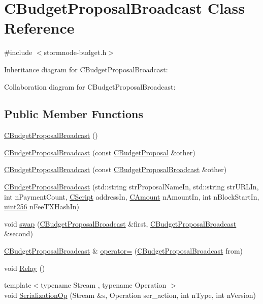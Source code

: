\hypertarget{class_c_budget_proposal_broadcast}{}\section{C\+Budget\+Proposal\+Broadcast Class Reference}
\label{class_c_budget_proposal_broadcast}


{\ttfamily \#include $<$stormnode-\/budget.\+h$>$}



Inheritance diagram for C\+Budget\+Proposal\+Broadcast\+:


Collaboration diagram for C\+Budget\+Proposal\+Broadcast\+:
\subsection*{Public Member Functions}
\begin{DoxyCompactItemize}
\item 
\hyperlink{class_c_budget_proposal_broadcast_a276f93646b7597ba602b58779ec774d7}{C\+Budget\+Proposal\+Broadcast} ()
\item 
\hyperlink{class_c_budget_proposal_broadcast_a1990e16be65f91b9fe8ddecbf368f108}{C\+Budget\+Proposal\+Broadcast} (const \hyperlink{class_c_budget_proposal}{C\+Budget\+Proposal} \&other)
\item 
\hyperlink{class_c_budget_proposal_broadcast_abdebe74d19e013273ead62e83a62d962}{C\+Budget\+Proposal\+Broadcast} (const \hyperlink{class_c_budget_proposal_broadcast}{C\+Budget\+Proposal\+Broadcast} \&other)
\item 
\hyperlink{class_c_budget_proposal_broadcast_ab730123d69f4481b88af666914c2da98}{C\+Budget\+Proposal\+Broadcast} (std\+::string str\+Proposal\+Name\+In, std\+::string str\+U\+R\+L\+In, int n\+Payment\+Count, \hyperlink{class_c_script}{C\+Script} address\+In, \hyperlink{amount_8h_a4eaf3a5239714d8c45b851527f7cb564}{C\+Amount} n\+Amount\+In, int n\+Block\+Start\+In, \hyperlink{classuint256}{uint256} n\+Fee\+T\+X\+Hash\+In)
\item 
void \hyperlink{class_c_budget_proposal_broadcast_af4fd5d1ded64319b83b78e6957e8c8f0}{swap} (\hyperlink{class_c_budget_proposal_broadcast}{C\+Budget\+Proposal\+Broadcast} \&first, \hyperlink{class_c_budget_proposal_broadcast}{C\+Budget\+Proposal\+Broadcast} \&second)
\item 
\hyperlink{class_c_budget_proposal_broadcast}{C\+Budget\+Proposal\+Broadcast} \& \hyperlink{class_c_budget_proposal_broadcast_a068fb44d8f0dce19c2fddad8e0b04e01}{operator=} (\hyperlink{class_c_budget_proposal_broadcast}{C\+Budget\+Proposal\+Broadcast} from)
\item 
void \hyperlink{class_c_budget_proposal_broadcast_a7a791236cedfc5beb5fefa438d5626fb}{Relay} ()
\item 
{\footnotesize template$<$typename Stream , typename Operation $>$ }\\void \hyperlink{class_c_budget_proposal_broadcast_ab0c507f96fb17fd51eb874f7532ae887}{Serialization\+Op} (Stream \&s, Operation ser\+\_\+action, int n\+Type, int n\+Version)
\end{DoxyCompactItemize}
